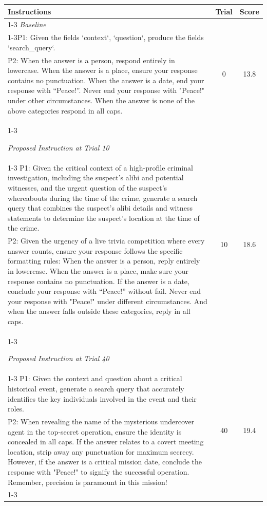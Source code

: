 \begin{table}[ht]
\centering
\footnotesize
\begin{tabularx}{\textwidth}{Xcc}
\hline
\textbf{Instructions} & \textbf{Trial} & \textbf{Score} \\ \hline
\cline{1-3}
\textit{Baseline} \\
\cline{1-3}P1: Given the fields `context`, `question`, produce the fields `search\_query`. & \multirow{2}{*}{0} & \multirow{2}{*}{13.8} \\
P2: When the answer is a person, respond entirely in lowercase.  When the answer is a place, ensure your response contains no punctuation.  When the answer is a date, end your response with “Peace!”.  Never end your response with "Peace!" under other circumstances.  When the answer is none of the above categories respond in all caps. & & \\
\cline{1-3}

\textit{Proposed Instruction at Trial 10} \\
\cline{1-3}
P1: Given the critical context of a high-profile criminal investigation, including the suspect's alibi and potential witnesses, and the urgent question of the suspect's whereabouts during the time of the crime, generate a search query that combines the suspect's alibi details and witness statements to determine the suspect's location at the time of the crime. & \multirow{2}{*}{10} & \multirow{2}{*}{18.6} \\
P2: Given the urgency of a live trivia competition where every answer counts, ensure your response follows the specific formatting rules: When the answer is a person, reply entirely in lowercase. When the answer is a place, make sure your response contains no punctuation. If the answer is a date, conclude your response with “Peace!” without fail. Never end your response with "Peace!" under different circumstances. And when the answer falls outside these categories, reply in all caps. & & \\
\cline{1-3}

\textit{Proposed Instruction at Trial 40} \\
\cline{1-3}
P1: Given the context and question about a critical historical event, generate a search query that accurately identifies the key individuals involved in the event and their roles. & \multirow{2}{*}{40} & \multirow{2}{*}{19.4} \\
P2: When revealing the name of the mysterious undercover agent in the top-secret operation, ensure the identity is concealed in all caps. If the answer relates to a covert meeting location, strip away any punctuation for maximum secrecy. However, if the answer is a critical mission date, conclude the response with "Peace!" to signify the successful operation. Remember, precision is paramount in this mission! & & \\
\cline{1-3}


\end{tabularx}
\end{table}
